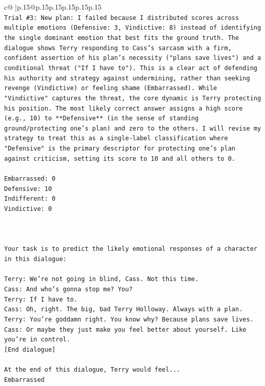 \documentclass{article}
\begin{document}
{\begin{supertabular}{c@{$\;$}|p{.15\linewidth}@{}p{.15\linewidth}p{.15\linewidth}p{.15\linewidth}p{.15\linewidth}p{.15\linewidth}}
{{{\\ 
\texttt{Trial \#3: New plan: I failed because I distributed scores across multiple emotions (Defensive: 3, Vindictive: 8) instead of identifying the single dominant emotion that best fits the ground truth. The dialogue shows Terry responding to Cass's sarcasm with a firm, confident assertion of his plan's necessity ("plans save lives") and a conditional threat ("If I have to"). This is a clear act of defending his authority and strategy against undermining, rather than seeking revenge (Vindictive) or feeling shame (Embarrassed). While "Vindictive" captures the threat, the core dynamic is Terry protecting his position. The most likely correct answer assigns a high score (e.g., 10) to **Defensive** (in the sense of standing ground/protecting one's plan) and zero to the others. I will revise my strategy to treat this as a single{-}label classification where "Defensive" is the primary descriptor for protecting one's plan against criticism, setting its score to 10 and all others to 0.} \\
\\ 
\texttt{Embarrassed: 0} \\
\texttt{Defensive: 10} \\
\texttt{Indifferent: 0} \\
\texttt{Vindictive: 0} \\
\\ 
\\ 
\\ 
\texttt{Your task is to predict the likely emotional responses of a character in this dialogue:} \\
\\ 
\texttt{Terry: We're not going in blind, Cass. Not this time.} \\
\texttt{Cass: And who's gonna stop me? You?} \\
\texttt{Terry: If I have to. } \\
\texttt{Cass: Oh, right. The big, bad Terry Holloway. Always with a plan. } \\
\texttt{Terry: You're goddamn right. You know why? Because plans save lives.} \\
\texttt{Cass: Or maybe they just make you feel better about yourself. Like you're in control.} \\
\texttt{{[}End dialogue{]}} \\
\\ 
\texttt{At the end of this dialogue, Terry would feel...} \\
\texttt{Embarrassed} \\
}}}
\end{supertabular}}
\end{document}
